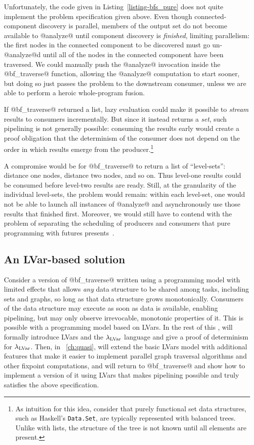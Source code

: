 Unfortunately, the code given in Listing~\ref{listing-bfs_pure} does
not quite implement the problem specification given above.  Even
though connected-component discovery is parallel, members of the
output set do not become available to @analyze@ until component
discovery is \emph{finished}, limiting parallelism: the first nodes in
the connected component to be discovered must go un-@analyze@d until
all of the nodes in the connected component have been traversed.  We
could manually push the @analyze@ invocation inside the @bf_traverse@
function, allowing the @analyze@ computation to start sooner, but
doing so just passes the problem to the downstream consumer, unless we
are able to perform a heroic whole-program fusion.

If @bf_traverse@ returned a list, lazy evaluation could make it
possible to \emph{stream} results to consumers incrementally.  But
since it instead returns a \emph{set}, such pipelining is not
generally possible: consuming the results early would create a proof
obligation that the determinism of the consumer does not depend on the
order in which results emerge from the producer.\footnote{As intuition
  for this idea, consider that purely functional set data structures,
  such as Haskell's \lstinline|Data.Set|, are typically represented
  with balanced trees.  Unlike with lists, the structure of the tree
  is not known until all elements are present.}

A compromise would be for @bf_traverse@ to return a list of
``level-sets'': distance one nodes, distance two nodes, and so on.
Thus level-one results could be consumed before level-two results are
ready.  Still, at the granularity of the individual level-sets, the
problem would remain: within each level-set, one would not be able to
launch all instances of @analyze@ and asynchronously use those results
that finished first.  Moreover, we would still have to contend with
the problem of separating the scheduling of producers and consumers
that pure programming with futures presents~\cite{monad-par}.

\subsection{An LVar-based solution}

Consider a version of @bf_traverse@ written using a programming model
with limited effects that allows \emph{any} data structure to be
shared among tasks, including sets and graphs, so long as that data
structure grows monotonically.  Consumers of the data structure may
execute as soon as data is available, enabling pipelining, but may
only observe irrevocable, monotonic properties of it. This is possible
with a programming model based on LVars.  In the rest of this ,
 will formally introduce LVars and the $\lambda_{\textrm{LVar}}$ language and
give a proof of determinism for $\lambda_{\textrm{LVar}}$.  Then, in
~\ref{ch:quasi},  will extend the basic LVars model with
additional features that make it easier to implement parallel graph
traversal algorithms and other fixpoint computations, and  will
return to @bf_traverse@ and show how to implement a version of it
using LVars that makes pipelining possible and truly satisfies the
above specification.
